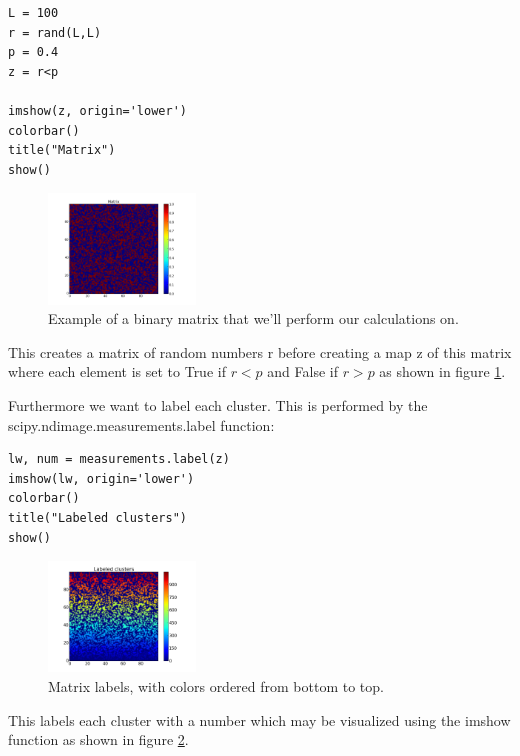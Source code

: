 \documentclass[a4paper,reprint,floatfix,amsmath,amssymb,aps,pra]{revtex4-1}
\begin{document}
\begin{lstlisting}
L = 100
r = rand(L,L)
p = 0.4
z = r<p

imshow(z, origin='lower')
colorbar()
title("Matrix")
show()
\end{lstlisting}
%
\begin{figure}
  \centering
  \includegraphics[width=0.35\textwidth]{./images/matrix.png}
  \caption{Example of a binary matrix that we'll perform our calculations on.}
  \label{fig:intro-matrix}
\end{figure}

This creates a matrix of random numbers r before creating a map z of this matrix where each element is set to True if $r < p$ and False if $r > p$ as shown in figure \ref{fig:intro-matrix}.

Furthermore we want to label each cluster. This is performed by the scipy.ndimage.measurements.label function:
%
\begin{lstlisting}
lw, num = measurements.label(z)
imshow(lw, origin='lower')
colorbar()
title("Labeled clusters")
show()
\end{lstlisting}
%
\begin{figure}[b]
  \centering
  \includegraphics[width=0.35\textwidth]{./images/labeled-matrix-ordered.png}
  \caption{Matrix labels, with colors ordered from bottom to top.}
  \label{fig:intro-labels}
\end{figure}
%
This labels each cluster with a number which may be visualized using the imshow function as shown in figure \ref{fig:intro-labels}.
\end{document}
